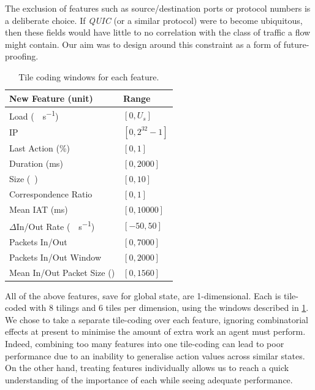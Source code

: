 \documentclass[conference, a4paper, 10pt, times]{IEEEtran}
\begin{document}
The exclusion of features such as source/destination ports or protocol numbers is a deliberate choice.
If \emph{QUIC} (or a similar protocol) were to become ubiquitous, then these fields would have little to no correlation with the class of traffic a flow might contain.
Our aim was to design around this constraint as a form of future-proofing.

\begin{table}
	\centering
	\caption{Tile coding windows for each feature.\label{tab:codings}}
	
	\begin{tabular}{@{}ll@{}}
		\toprule
		New Feature (unit) & Range \\
		\midrule
		Load (\si{\mega\bit\per\second}) & $[0, U_s]$ \\
		IP & $[0, 2^{32}-1]$ \\
		Last Action (\si{\percent}) & $[0, 1]$ \\
		Duration (\si{\milli\second}) & $[0, \num{2000}]$ \\
		Size (\si{\mebi\byte}) & $[0,10]$ \\
		Correspondence Ratio & $[0,1]$ \\
		Mean IAT (\si{\milli\second}) & $[0, \num{10000}]$ \\
		$\Delta$In/Out Rate (\si{\mega\bit\per\second}) & $[-50, 50]$ \\
		Packets In/Out & $[0, 7000]$ \\
		Packets In/Out Window & $[0, 2000]$ \\
		Mean In/Out Packet Size (\si{\byte}) & $[0, 1560]$ \\
		\bottomrule
	\end{tabular}
\end{table}

All of the above features, save for global state, are 1-dimensional.
Each is tile-coded with 8 tilings and 6 tiles per dimension, using the windows described in \cref{tab:codings}.
We chose to take a separate tile-coding over each feature, ignoring combinatorial effects at present to minimise the amount of extra work an agent must perform.
Indeed, combining too many features into one tile-coding can lead to poor performance due to an inability to generalise action values across similar states.
On the other hand, treating features individually allows us to reach a quick understanding of the importance of each while seeing adequate performance.
\end{document}

